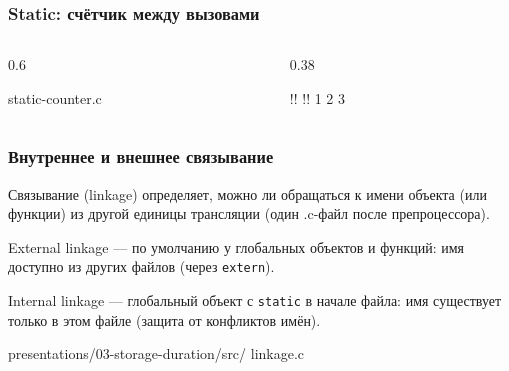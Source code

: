 \documentclass[compress, 8pt, aspectratio=169]{beamer}
\begin{document}
\begin{frame}[fragile]

    \frametitle{Static: счётчик между вызовами}

    \begin{columns}[T]

        \begin{column}{0.6\textwidth}

                {static-counter.c}

        \end{column}

        \begin{column}{0.38\textwidth}

            \begin{terminalwindow}
!!
!!
1
2
3
            \end{terminalwindow}

        \end{column}

    \end{columns}

\end{frame}

\begin{frame}[fragile]

    \frametitle{Внутреннее и внешнее связывание}

    Связывание (linkage) определяет, можно ли обращаться
    к имени объекта (или функции) из другой единицы
    трансляции (один .c-файл после препроцессора).

    \bigbreak

    \begin{myitemize}

        \item External linkage --- по умолчанию у
            глобальных объектов и функций: имя доступно
            из других файлов (через \texttt{extern}).

        \item Internal linkage --- глобальный объект
            с \texttt{static} в начале файла: имя
            существует только в этом файле (защита от
            конфликтов имён).

    \end{myitemize}

    \bigbreak

        {presentations/03-storage-duration/src/}
        {linkage.c}

\end{frame}
\end{document}
